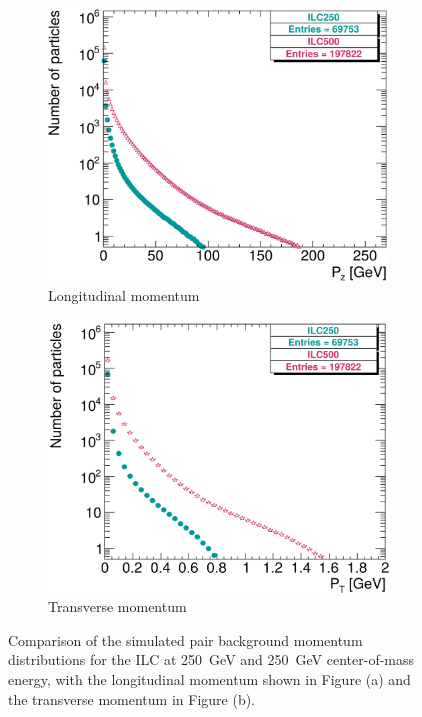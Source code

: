 \begin{figure}
 \centering
  \begin{subfigure}[b]{0.49\textwidth}
   \centering
    \includegraphics[width=0.99\textwidth]{Figures/Pairs/250_500_pairs_comparison_Pz.png}
   \caption{Longitudinal momentum}
   \end{subfigure}
   \hfill
    \begin{subfigure}[b]{0.49\textwidth}
   \centering
    \includegraphics[width=\textwidth]{Figures/Pairs/250_500_pairs_comparison_PT.png}
   \caption{Transverse momentum}
   \end{subfigure}
   \caption[Plots of pair background longitudinal and transverse momentum distributions]{Comparison of the simulated pair background momentum distributions for the ILC at \SI[detect-all]{250}{\GeV} and \SI[detect-all]{250}{\GeV} center-of-mass energy, with the longitudinal momentum shown in Figure (a) and the transverse momentum in Figure (b).}
   \label{fig:PairBkgMomentum}
\end{figure}
